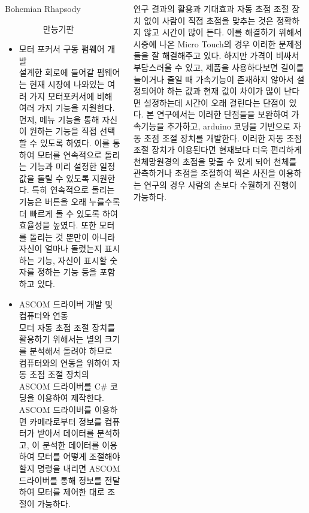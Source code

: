\documentclass{gshs_poster_beamer}
\begin{document}
\begin{columns}[T]
\begin{posterbox}[colbacktitle=black,coltitle=white,colback=black!5]{Bohemian Rhapsody}
\begin{itemize}
\begin{figure}[h]
		\caption{만능기판}
		\label{fig:circuit1}
	\end{figure}
	\item 모터 포커서 구동 펌웨어 개발\\
	설계한 회로에 들어갈 펌웨어는 현재 시장에 나와있는 여러 가지 모터포커서에 비해 여러 가지 기능을 지원한다. 먼저, 메뉴 기능을 통해 자신이 원하는 기능을 직접 선택할 수 있도록 하였다. 이를 통하여 모터를 연속적으로 돌리는 기능과 미리 설정한 일정값을 돌릴 수 있도록 지원한다. 특히 연속적으로 돌리는 기능은 버튼을 오래 누를수록 더 빠르게 돌 수 있도록 하여 효율성을 높였다. 또한 모터를 돌리는 것 뿐만이 아니라 자신이 얼마나 돌렸는지 표시하는 기능, 자신이 표시할 숫자를 정하는 기능 등을 포함하고 있다.
	\item ASCOM 드라이버 개발 및 컴퓨터와 연동\\
	모터 자동 초점 조절 장치를 활용하기 위해서는 별의 크기를 분석해서 돌려야 하므로 컴퓨터와의 연동을 위하여 자동 초점 조절 장치의 ASCOM 드라이버를 C\# 코딩을 이용하여 제작한다. ASCOM 드라이버를 이용하면 카메라로부터 정보를 컴퓨터가 받아서 데이터를 분석하고, 이 분석한 데이터를 이용하여 모터를 어떻게 조절해야 할지 명령을 내리면 ASCOM 드라이버를 통해 정보를 전달하여 모터를 제어한 대로 조절이 가능하다.
  \end{itemize}
\end{posterbox}

\begin{posterbox}[colbacktitle=blue!50!black,coltitle=white,colback=cyan!5]{연구 결과의 활용과 기대효과}
자동 초점 조절 장치 없이 사람이 직접 초점을 맞추는 것은 정확하지 않고 시간이 많이 든다. 이를 해결하기 위해서 시중에 나온 Micro Touch의 경우 이러한 문제점들을 잘 해결해주고 있다. 하지만 가격이 비싸서 부담스러울 수 있고, 제품을 사용하다보면 길이를 늘이거나 줄일 때 가속기능이 존재하지 않아서 설정되어야 하는 값과 현재 값이 차이가 많이 난다면 설정하는데 시간이 오래 걸린다는 단점이 있다. 본 연구에서는 이러한 단점들을 보완하여 가속기능을 추가하고, arduino 코딩을 기반으로 자동 초점 조절 장치를 개발한다. 이러한 자동 초점 조절 장치가 이용된다면 현재보다 더욱 편리하게 천체망원경의 초점을 맞출 수 있게 되어 천체를 관측하거나 초점을 조절하여 찍은 사진을 이용하는 연구의 경우 사람의 손보다 수월하게 진행이 가능하다.
\end{posterbox}

\vspace{1em}


\end{columns}
\end{document}
